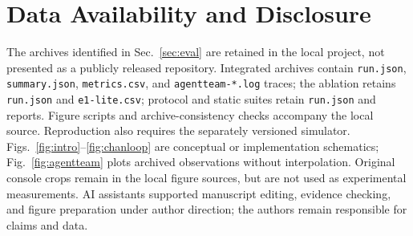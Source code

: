 \section*{Data Availability and Disclosure}
The archives identified in Sec.~\ref{sec:eval} are retained in the local
project, not presented as a publicly released repository. Integrated archives
contain \texttt{run.json}, \texttt{summary.json}, \texttt{metrics.csv}, and
\texttt{agentteam-*.log} traces; the ablation retains \texttt{run.json} and
\texttt{e1-lite.csv}; protocol and static suites retain \texttt{run.json}
and reports. Figure scripts and archive-consistency checks accompany the
local source. Reproduction also requires the separately versioned simulator.
Figs.~\ref{fig:intro}--\ref{fig:chanloop} are conceptual or implementation
schematics; Fig.~\ref{fig:agentteam} plots archived observations without
interpolation. Original console crops remain in the local figure sources,
but are not used as experimental measurements. AI assistants supported manuscript
editing, evidence checking, and figure preparation under author direction;
the authors remain responsible for claims and data.
